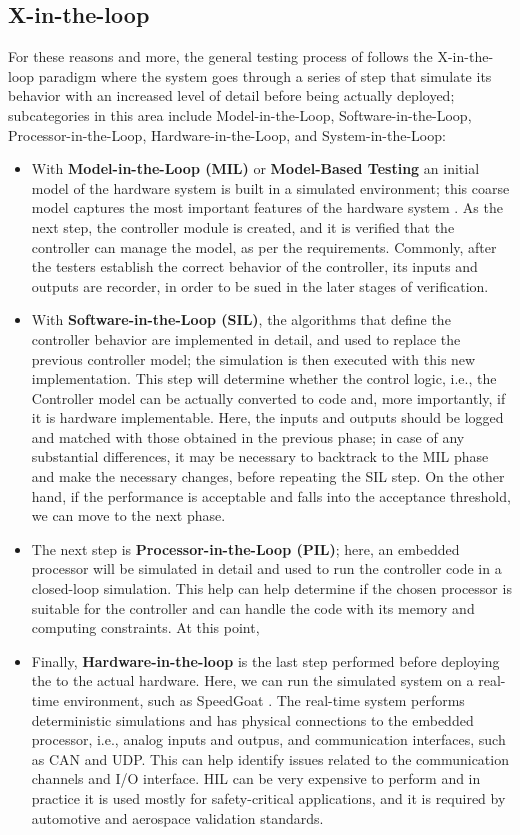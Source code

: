 \subsection{X-in-the-loop}
For these reasons and more, the general testing process of \ess follows the X-in-the-loop paradigm \cite{DBLP:journals/software/GarousiFKY18} where the system goes through a series of step that simulate its behavior with an increased level of detail before being actually deployed; subcategories in this area include Model-in-the-Loop, Software-in-the-Loop, Processor-in-the-Loop, Hardware-in-the-Loop, and System-in-the-Loop:
\begin{itemize}
    \item With \textbf{Model-in-the-Loop (MIL)} or \textbf{Model-Based Testing} an initial model of the hardware system is built in a simulated environment; this coarse model captures the most important features of the hardware system \cite{XLoop}. As the next step, the controller module is created, and it is verified that the controller can manage the model, as per the requirements. Commonly, after the testers establish the correct behavior of the controller, its inputs and outputs are recorder, in order to be sued in the later stages of verification.
    \item With \textbf{Software-in-the-Loop (SIL)}, the algorithms that define the controller behavior are implemented in detail, and used to replace the previous controller model; the simulation is then executed with this new implementation. This step will determine whether the control logic, i.e., the Controller model can be actually converted to code and, more importantly, if it is hardware implementable. Here, the inputs and outputs should be logged and matched with those obtained in the previous phase; in case of any substantial differences, it may be necessary to backtrack to the MIL phase and make the necessary changes, before repeating the SIL step. On the other hand, if the performance is acceptable and falls into the acceptance threshold, we can move to the next phase.
    \item The next step is \textbf{Processor-in-the-Loop (PIL)}; here, an embedded processor will be simulated in detail and used to run the controller code in a closed-loop simulation. This help can help determine if the chosen processor is suitable for the controller and can handle the code with its memory and computing constraints. At this point, 
    \item Finally, \textbf{Hardware-in-the-loop} is the last step performed before deploying the \es to the actual hardware. Here, we can run the simulated system on a real-time environment, such as SpeedGoat \cite{SpeedGoat}. The real-time system performs deterministic simulations and has physical connections to the embedded processor, i.e., analog inputs and outpus, and communication interfaces, such as CAN and UDP. This can help identify issues related to the communication channels and I/O interface. HIL can be very expensive to perform and in practice it is used mostly for safety-critical applications, and it is required by automotive and aerospace validation standards. 
\end{itemize}


